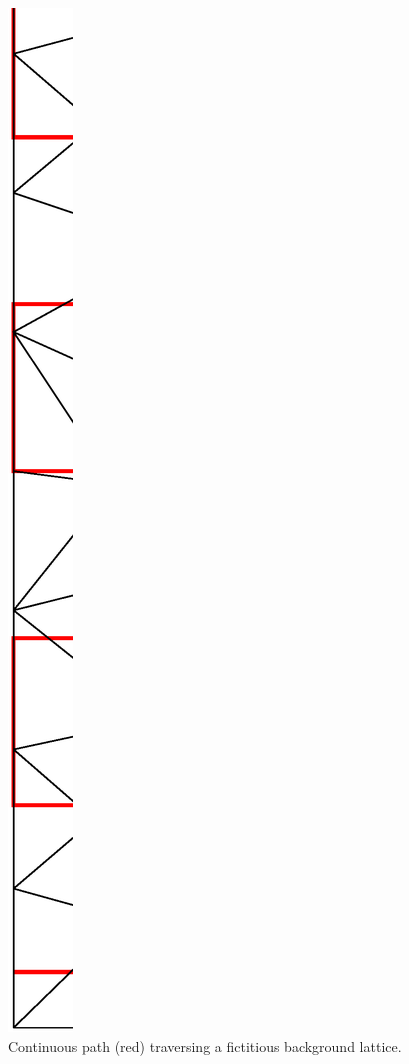 \documentclass[a4paper,12pt,onecolumn]{article}
\begin{document}
\begin{figure}[htbp]
\centering
\includegraphics[width=.25\textwidth]{figures/velocity_interpolation_path.ps}
\caption[Continuous path traversing a fictitious background lattice]
{Continuous path (red) traversing a fictitious background lattice.}
\label{fig:velocity_interpolation_path}
\end{figure}
\end{document}
